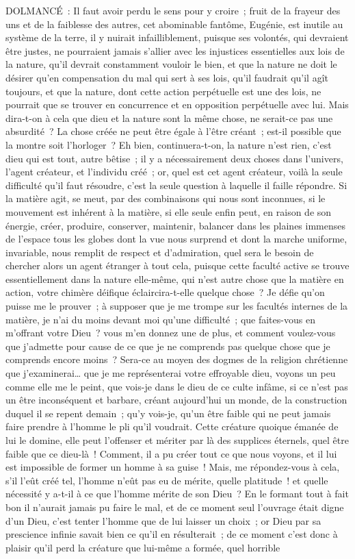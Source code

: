 \documentclass[french,twoside]{book} %
\begin{document}
DOLMANCÉ : Il faut avoir perdu le sens pour y croire ; fruit de la frayeur des uns et de la faiblesse des autres, cet abominable fantôme, Eugénie, est inutile au système de la terre, il y nuirait infailliblement, puisque ses volontés, qui devraient être justes, ne pourraient jamais s’allier avec les injustices essentielles aux lois de la nature, qu’il devrait constamment vouloir le bien, et que la nature ne doit le désirer qu’en compensation du mal qui sert à ses lois, qu’il faudrait qu’il agît toujours, et que la nature, dont cette action perpétuelle est une des lois, ne pourrait que se trouver en concurrence et en opposition perpétuelle avec lui. Mais dira-t-on à cela que dieu et la nature sont la même chose, ne serait-ce pas une absurdité ? La chose créée ne peut être égale à l’être créant ; est-il possible que la montre soit l’horloger ? Eh bien, continuera-t-on, la nature n’est rien, c’est dieu qui est tout, autre bêtise ; il y a nécessairement deux choses dans l’univers, l’agent créateur, et l’individu créé ; or, quel est cet agent créateur, voilà la seule difficulté qu’il faut résoudre, c’est la seule question à laquelle il faille répondre. Si la matière agit, se meut, par des combinaisons qui nous sont inconnues, si le mouvement est inhérent à la matière, si elle seule enfin peut, en raison de son énergie, créer, produire, conserver, maintenir, balancer dans les plaines immenses de l’espace tous les globes dont la vue nous surprend et dont la marche uniforme, invariable, nous remplit de respect et d’admiration, quel sera le besoin de chercher alors un agent étranger à tout cela, puisque cette faculté active se trouve essentiellement dans la nature elle-même, qui n’est autre chose que la matière en action, votre chimère déifique éclaircira-t-elle quelque chose ? Je défie qu’on puisse me le prouver ; à supposer que je me trompe sur les facultés internes de la matière, je n’ai du moins devant moi qu’une difficulté ; que faites-vous en m’offrant votre Dieu ? vous m’en donnez une de plus, et comment voulez-vous que j’admette pour cause de ce que je ne comprends pas quelque chose que je comprends encore moins ? Sera-ce au moyen des dogmes de la religion chrétienne que j’examinerai… que je me représenterai votre effroyable dieu, voyons un peu comme elle me le peint, que vois-je dans le dieu de ce culte infâme, si ce n’est pas un être inconséquent et barbare, créant aujourd’hui un monde, de la construction duquel il se repent demain ; qu’y vois-je, qu’un être faible qui ne peut jamais faire prendre à l’homme le pli qu’il voudrait. Cette créature quoique émanée de lui le domine, elle peut l’offenser et mériter par là des supplices éternels, quel être faible que ce dieu-là ! Comment, il a pu créer tout ce que nous voyons, et il lui est impossible de former un homme à sa guise ! Mais, me répondez-vous à cela, s’il l’eût créé tel, l’homme n’eût pas eu de mérite, quelle platitude ! et quelle nécessité y a-t-il à ce que l’homme mérite de son Dieu ? En le formant tout à fait bon il n’aurait jamais pu faire le mal, et de ce moment seul l’ouvrage était digne d’un Dieu, c’est tenter l’homme que de lui laisser un choix ; or Dieu par sa prescience infinie savait bien ce qu’il en résulterait ; de ce moment c’est donc à plaisir qu’il perd la créature que lui-même a formée, quel horrible 
\end{document}
